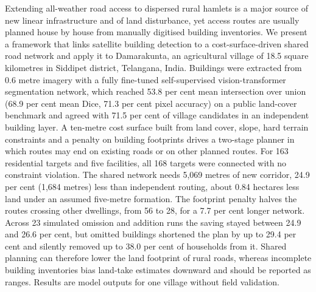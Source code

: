Extending all-weather road access to dispersed rural hamlets is a major source of new linear infrastructure and of land disturbance, yet access routes are usually planned house by house from manually digitised building inventories. We present a framework that links satellite building detection to a cost-surface-driven shared road network and apply it to Damarakunta, an agricultural village of 18.5 square kilometres in Siddipet district, Telangana, India. Buildings were extracted from 0.6 metre imagery with a fully fine-tuned self-supervised vision-transformer segmentation network, which reached 53.8 per cent mean intersection over union (68.9 per cent mean Dice, 71.3 per cent pixel accuracy) on a public land-cover benchmark and agreed with 71.5 per cent of village candidates in an independent building layer. A ten-metre cost surface built from land cover, slope, hard terrain constraints and a penalty on building footprints drives a two-stage planner in which routes may end on existing roads or on other planned routes. For 163 residential targets and five facilities, all 168 targets were connected with no constraint violation. The shared network needs 5,069 metres of new corridor, 24.9 per cent (1,684 metres) less than independent routing, about 0.84 hectares less land under an assumed five-metre formation. The footprint penalty halves the routes crossing other dwellings, from 56 to 28, for a 7.7 per cent longer network. Across 23 simulated omission and addition runs the saving stayed between 24.9 and 26.6 per cent, but omitted buildings shortened the plan by up to 29.4 per cent and silently removed up to 38.0 per cent of households from it. Shared planning can therefore lower the land footprint of rural roads, whereas incomplete building inventories bias land-take estimates downward and should be reported as ranges. Results are model outputs for one village without field validation.
